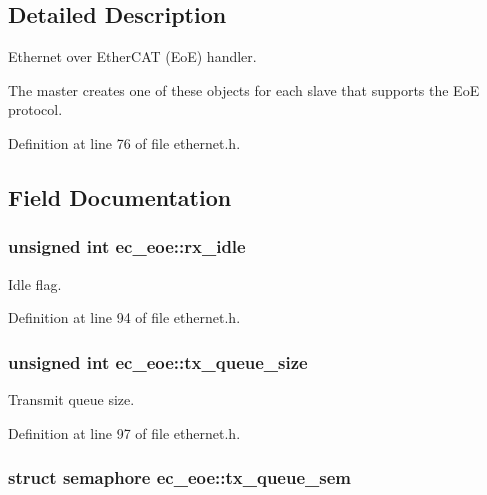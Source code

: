 \subsection{\-Detailed \-Description}
\-Ethernet over \-Ether\-C\-A\-T (\-Eo\-E) handler. 

\-The master creates one of these objects for each slave that supports the \-Eo\-E protocol. 

\-Definition at line 76 of file ethernet.\-h.



\subsection{\-Field \-Documentation}
\subsubsection[{rx\-\_\-idle}]{\setlength{\rightskip}{0pt plus 5cm}unsigned int {\bf ec\-\_\-eoe\-::rx\-\_\-idle}}\label{structec__eoe_ad0775c67897e6c38beb0b656e8732d05}


\-Idle flag. 



\-Definition at line 94 of file ethernet.\-h.

\subsubsection[{tx\-\_\-queue\-\_\-size}]{\setlength{\rightskip}{0pt plus 5cm}unsigned int {\bf ec\-\_\-eoe\-::tx\-\_\-queue\-\_\-size}}\label{structec__eoe_acaccde2a704283ace65f59aa1611e7cc}


\-Transmit queue size. 



\-Definition at line 97 of file ethernet.\-h.

\subsubsection[{tx\-\_\-queue\-\_\-sem}]{\setlength{\rightskip}{0pt plus 5cm}struct semaphore {\bf ec\-\_\-eoe\-::tx\-\_\-queue\-\_\-sem}}\label{structec__eoe_a53d2194eaa281eeaf4d101443b4117a6}


